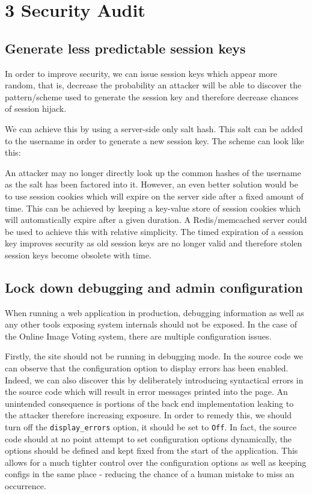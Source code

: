 \documentclass[a4paper, 12pt]{article}
\begin{document}
\section*{3 Security Audit}
\subsection*{Generate less predictable session keys}
In order to improve security, we can issue session keys which appear more random, that is, decrease the probability an attacker will be able to discover the pattern/scheme used to generate the session key and therefore decrease chances of session hijack.

We can achieve this by using a server-side only salt hash. This salt can be added to the username in order to generate a new session key. The scheme can look like this:


An attacker may no longer directly look up the common hashes of the username as the salt has been factored into it. However, an even better solution would be to use session cookies which will expire on the server side after a fixed amount of time. This can be achieved by keeping a key-value store of session cookies which will automatically expire after a given duration. A Redis/memcached server could be used to achieve this with relative simplicity. The timed expiration of a session key improves security as old session keys are no longer valid and therefore stolen session keys become obsolete with time.

\subsection*{Lock down debugging and admin configuration}
When running a web application in production, debugging information as well as any other tools exposing system internals should not be exposed. In the case of the Online Image Voting system, there are multiple configuration issues.

Firstly, the site should not be running in debugging mode. In the source code we can observe that the configuration option to display errors has been enabled. Indeed, we can also discover this by deliberately introducing syntactical errors in the source code which will result in error messages printed into the page. An unintended consequence is portions of the back end implementation leaking to the attacker therefore increasing exposure. In order to remedy this, we should turn off the \texttt{display\_errors} option, it should be set to \texttt{Off}. In fact, the source code should at no point attempt to set configuration options dynamically, the options should be defined and kept fixed from the start of the application. This allows for a much tighter control over the configuration options as well as keeping configs in the same place - reducing the chance of a human mistake to miss an occurrence. 
\end{document}
